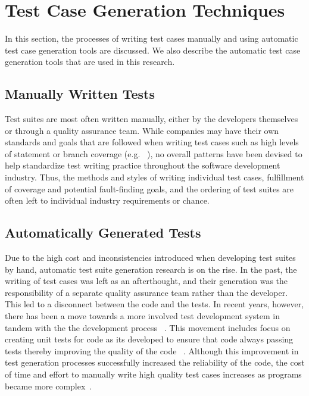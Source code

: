 
\section{Test Case Generation Techniques}
\label{sec:background}
In this section, the processes of writing test cases manually and using automatic test case generation tools are discussed.  We also describe the automatic test case generation tools that are used in this research.

\subsection{Manually Written Tests}
Test suites are most often written manually, either by the developers themselves or through a quality assurance team.  While companies may have their own standards and goals that are followed when writing test cases such as high levels of statement or branch coverage (e.g. ~\cite{DO-178B, IEC61508}), no overall patterns have been devised to help standardize test writing practice throughout the software development industry. Thus, the methods and styles of writing individual test cases, fulfillment of coverage and potential fault-finding goals, and the ordering of test suites are often left to individual industry requirements or chance.  


\subsection{Automatically Generated Tests}
Due to the high cost and inconsistencies introduced when developing test suites by hand, automatic test suite generation research is on the rise.  In the past, the writing of test cases was left as an afterthought, and their generation was the responsibility of a separate quality assurance team rather than the developer.  This led to a disconnect between the code and the tests.  In recent years, however, there has been a move towards a more involved test development system in tandem with the the development process ~\cite{Gelperin:1988:GST:62959.62965}.  This movement includes focus on creating unit tests for code as its developed to ensure that code always passing tests thereby improving the quality of the code ~\cite{Canfora:2006:EAT:1159733.1159788}.  Although this improvement in test generation processes successfully increased the reliability of the code, the cost of time and effort to manually write high quality test cases increases as programs became more complex~\cite{clarke1998automated}. 

